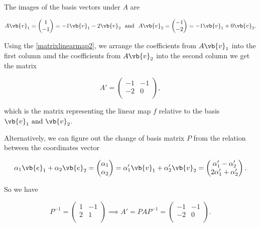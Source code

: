 \documentclass[a4paper,12pt]{report}
\begin{document}
{The images of the basis vectors under \(A\) are

\begin{equation}
    A\vb{v} _{1} = \begin{pmatrix}
         1 \\
         -1 \\
    \end{pmatrix} = -1\vb{v} _{1}  - 2 \vb{v} _{2} ~\text { and }~  A\vb{v} _{2} = \begin{pmatrix}
         -1 \\
         -2 \\
    \end{pmatrix} = -1\vb{v} _{1} +0\vb{v} _{2} . 
\end{equation}

Using the \cref{matrixlinearmap2}, we arrange the coefficients from \(A\vb{v} _{1} \) into the first column amd the coefficients from \(A\vb{v} _{2} \) into the second column we get the matrix  

\begin{equation}
    A' = \begin{pmatrix}
        -1 &  -1 \\
        -2 &  0 \\
    \end{pmatrix},
\end{equation}

which is the matrix representing the linear map \(f\) relative to the basis \(\vb{v} _{1} \text { and } \vb{v} _{2} \).   

Alternatively, we can figure out the change of basis matrix \(P\) from the relation between the coordinates vector

\begin{equation}
    \alpha _{1}\vb{e} _{1}+\alpha _{2}\vb{e} _{2} = \begin{pmatrix}
         \alpha _{1}  \\
         \alpha _{2}  \\
    \end{pmatrix}  =  \alpha _{1}' \vb{v} _{1}+ \alpha _{2}'\vb{v} _{2} = \begin{pmatrix}
         \alpha _{1}' - \alpha _{2}'   \\
         2\alpha _{1}' + \alpha _{2}'   \\
    \end{pmatrix} .
\end{equation}

So we have

\begin{equation}
    P^{-1} = \begin{pmatrix}
        1 &  -1 \\
        2 &  1 \\
    \end{pmatrix} \implies A' = PAP^{-1} = \begin{pmatrix}
        -1 &  -1 \\
        -2 &  0 \\
    \end{pmatrix}.
\end{equation}
} 
\end{document}

